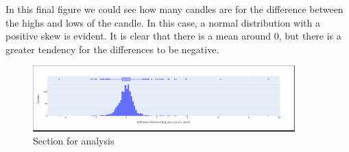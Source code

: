 \documentclass{article}
\begin{document}
In this final figure we could see how many candles are for the difference
between the highs and lows of the candle. In this case,
a normal distribution with a positive skew is evident. It is clear that there is a mean around 0, but there is a greater tendency for the differences to be negative.
\begin{figure}[h]
  \caption{Section for analysis}
  \begin{center}
    \includegraphics[width=0.9\textwidth]{figures/18.png}
  \end{center}
\end{figure}
\end{document}
